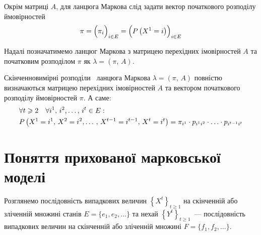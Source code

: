 Окрім матриці $A$, для ланцюга Маркова слід задати вектор початкового розподілу ймовірностей
\begin{equation*}
    \pi = \Bigl( \pi_i \Bigr)_{i \in E} = \Bigl( P\left( X^{1} = i \right) \Bigr)_{i \in E}
\end{equation*}

Надалі позначатимемо ланцюг Маркова з матрицею перехідних імовірностей $A$ та початковим розподілом $\pi$ як $\lambda=(\pi,\,A)$.

Скінченновимірні розподіли~\cite{Norris1997} ланцюга Маркова $\lambda=(\pi,\,A)$ повністю визначаються матрицею перехідних імовірностей $A$ та вектором початкового розподілу ймовірностей $\pi$. А саме:
\begin{align}
    &\forall t\geqslant 2 \quad \forall i^1,\,i^2,\ldots,\,i^{t} \in E: \notag \\
    &P\left( X^{1}=i^{1},\,X^{2}=i^{2},\ldots\,,\, X^{t-1}=i^{t-1},\, X^{t}=i^{t} \right) = \pi_{i^1} \cdot p_{i^1i^2} \cdot \ldots \cdot p_{i^{t-1}i^{t}} \label{eq: finite-dimensional distributions}
\end{align}

\section{Поняття прихованої марковської моделі}

Розглянемо послідовність випадкових величин $\left\{ X^t \right\}_{t\geqslant 1}$ на скінченній або зліченній множині станів $E=\{e_1,e_2,\ldots\}$ та нехай $\left\{ Y^t \right\}_{t\geqslant 1}$~--- послідовність випадкових величин на скінченній або зліченній множині $F=\{f_1,f_2,\ldots\}$. 

